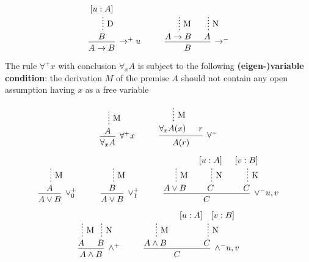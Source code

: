 \documentclass[11pt]{article}
\begin{document}
\begin{equation*}
\begin{prooftree}[center=false]
\hypo{[u:A]}
\ellipsis{D}{B}
\infer1[\(\to^+u\)]{A\to B}
\end{prooftree}
\hspace{1cm}
\begin{prooftree}[center=false]
\hypo{}
\ellipsis{M}{A\to B}
\hypo{}
\ellipsis{N}{A}
\infer2[\(\to^-\)]{B}
\end{prooftree}
\end{equation*}


The rule \(\forall^+x\) with conclusion \(\forall_xA\) is subject to the
following \textbf{(eigen-)variable condition}: the derivation \(M\) of the premise
\(A\) should not contain any open assumption having \(x\) as a free variable

\begin{equation*}
\begin{prooftree}[center=false]
\hypo{}
\ellipsis{M}{A}
\infer1[\(\forall^+x\)]{\forall_xA}
\end{prooftree}
\hspace{1cm}
\begin{prooftree}[center=false]
\hypo{}
\ellipsis{M}{\forall_xA(x)}
\hypo{r}
\infer2[\(\forall^-\)]{A(r)}
\end{prooftree}
\end{equation*}

\begin{equation*}
\begin{prooftree}[center=false]
\hypo{}
\ellipsis{M}{A}
\infer1[\(\vee_0^+\)]{A\vee B}
\end{prooftree}\hspace{1cm}
\begin{prooftree}[center=false]
\hypo{}
\ellipsis{M}{B}
\infer1[\(\vee_1^+\)]{A\vee B}
\end{prooftree}\hspace{1cm}
\begin{prooftree}[center=false]
\hypo{}
\ellipsis{M}{A\vee B}
\hypo{[u:A]}
\ellipsis{N}{C}
\hypo{[v:B]}
\ellipsis{K}{C}
\infer3[\(\vee^-u,v\)]{C}
\end{prooftree}
\end{equation*}

\begin{equation*}
\begin{prooftree}[center=false]
\hypo{}
\ellipsis{M}{A}
\hypo{}
\ellipsis{N}{B}
\infer2[\(\wedge^+\)]{A\wedge B}
\end{prooftree}\hspace{1cm}
\begin{prooftree}[center=false]
\hypo{}
\ellipsis{M}{A\wedge B}
\hypo{[u:A]\quad [v:B]}
\ellipsis{N}{C}
\infer2[\(\wedge^-u,v\)]{C}
\end{prooftree}
\end{equation*}
\end{document}
